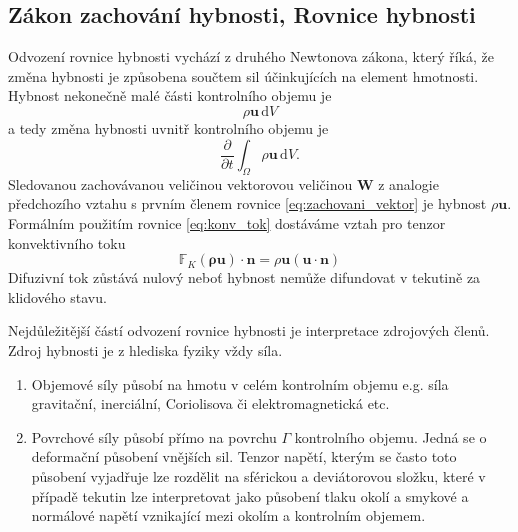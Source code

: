 \subsection{Zákon zachování hybnosti, Rovnice hybnosti}
Odvození rovnice hybnosti vychází z druhého Newtonova zákona, který říká, že změna hybnosti je způsobena součtem sil účinkujících na element hmotnosti.
Hybnost nekonečně malé části kontrolního objemu je\begin{equation*}
\rho \mathbf{u}\,\mathrm{d}V
\end{equation*}
a tedy změna hybnosti uvnitř kontrolního objemu je
\begin{equation*}
\dfrac{\partial}{\partial t}\int_\Omega\rho\mathbf{u}\,\mathrm{d}V.
\end{equation*}
Sledovanou zachovávanou veličinou vektorovou veličinou $\mathbf{W}$ z analogie předchozího vztahu s prvním členem rovnice \ref{eq:zachovani_vektor} je hybnost $\rho \mathbf{u}$. Formálním použitím rovnice \ref{eq:konv_tok} dostáváme vztah pro tenzor konvektivního toku
\begin{equation*}
\mathbb{F}_K(\mathbf{\rho\mathbf{u}})\cdot \mathbf{n}=\rho\mathbf{u} (\mathbf{u}\cdot\mathbf{n})
\end{equation*}
Difuzivní tok zůstává nulový neboť hybnost nemůže difundovat v tekutině za klidového stavu.

Nejdůležitější částí odvození rovnice hybnosti je interpretace zdrojových členů. Zdroj hybnosti je z hlediska fyziky vždy síla.
\begin{enumerate}
	\item Objemové síly působí na hmotu v celém kontrolním objemu e.g. síla gravitační, inerciální, Coriolisova či elektromagnetická etc. 
	\item Povrchové síly působí přímo na povrchu $\Gamma$ kontrolního objemu. Jedná se o deformační působení vnějších sil. Tenzor napětí, kterým se často toto působení vyjadřuje lze rozdělit na sférickou a deviátorovou složku, které v případě tekutin lze interpretovat jako působení tlaku okolí a smykové a normálové napětí vznikající mezi okolím a kontrolním objemem.
\end{enumerate}

